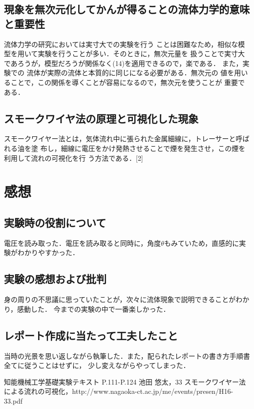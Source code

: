 \documentclass[twocolumn,10pt,a4j]{jsarticle}
\begin{document}
  \subsection{現象を無次元化してかんが得ることの流体力学的意味と重要性}
    流体力学の研究においては実寸大での実験を行う
    ことは困難なため，相似な模型を用いて実験を行うことが多い．そのときに，無次元量を
    扱うことで実寸大であろうが，模型だろうが関係なく(14)を適用できるので，楽である．
    また，実験での
    流体が実際の流体と本質的に同じになる必要がある．無次元の
    値を用いることで，この関係を導くことが容易になるので，無次元を使うことが
    重要である．
  \subsection{スモークワイヤ法の原理と可視化した現象}
    スモークワイヤー法とは，気体流れ中に張られた金属細線に，トレーサーと呼ばれる油を塗
    布し，細線に電圧をかけ発熱させることで煙を発生させ，この煙を利用して流れの可視化を行
    う方法である．[2]
\section{感想}
  \subsection{実験時の役割について}
    電圧を読み取った．電圧を読み取ると同時に，角度$\theta$もみていため，直感的に実験がわかりやすかった．
  \subsection{実験の感想および批判}
    身の周りの不思議に思っていたことが，次々に流体現象で説明できることがわかり，感動した．
    今までの実験の中で一番楽しかった．
  \subsection{レポート作成に当たって工夫したこと}
    当時の光景を思い返しながら執筆した．また，配られたレポートの書き方手順書全てに従うことはせずに，
    少し変えながらやってしまった．

\begin{thebibliography}{3}
  \bibitem{}知能機械工学基礎実験テキスト P.111-P.124
  \bibitem{}池田 悠太，33 スモークワイヤー法による流れの可視化，http://www.nagaoka-ct.ac.jp/me/events/presen/H16-33.pdf

\end{thebibliography}
\end{document}
